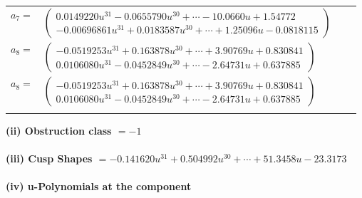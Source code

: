 \documentclass[1p]{elsarticle_modified}
\theoremstyle{definition}
\begin{document}
\begin{tabular}{m{7pt} m{180pt} m{7pt} m{180pt} }
\flushright $a_{7}=$&$\begin{pmatrix}0.0149220 u^{31}-0.0655790 u^{30}+\cdots-10.0660 u+1.54772\\-0.00696861 u^{31}+0.0183587 u^{30}+\cdots+1.25096 u-0.0818115\end{pmatrix}$ \\
\flushright $a_{8}=$&$\begin{pmatrix}-0.0519253 u^{31}+0.163878 u^{30}+\cdots+3.90769 u+0.830841\\0.0106080 u^{31}-0.0452849 u^{30}+\cdots-2.64731 u+0.637885\end{pmatrix}$\\ \flushright $a_{8}=$&$\begin{pmatrix}-0.0519253 u^{31}+0.163878 u^{30}+\cdots+3.90769 u+0.830841\\0.0106080 u^{31}-0.0452849 u^{30}+\cdots-2.64731 u+0.637885\end{pmatrix}$\\&\end{tabular}
\flushleft \textbf{(ii) Obstruction class $= -1$}\\~\\
\flushleft \textbf{(iii) Cusp Shapes $= -0.141620 u^{31}+0.504992 u^{30}+\cdots+51.3458 u-23.3173$}\\~\\
\newpage\renewcommand{\arraystretch}{1}
\flushleft \textbf{(iv) u-Polynomials at the component}\newline \\
\end{document}
